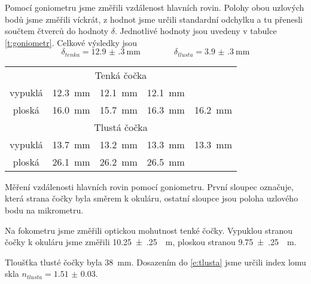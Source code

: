Pomocí goniometru jsme změřili vzdálenost hlavních rovin. 
Polohy obou uzlových bodů jsme změřili víckrát, z hodnot jsme určili standardní odchylku a tu přenesli součtem čtverců do hodnoty $\delta$. Jednotlivé hodnoty jsou uvedeny v tabulce \ref{t:goniometr}. 
Celkové výsledky jsou
\begin{equation*}
\delta_{tenka} = \SI{12.9(3)}{\mm} \qquad \qquad \delta_{tlusta} = \SI{3.9(3)}{\mm}
\end{equation*}


\begin{tabulka}[htbp]
\centering
\begin{tabular}{c|cccc}
\multicolumn{5}{c}{Tenká čočka} \\
vypuklá & \SI{12.3}{\mm} & \SI{12.1}{\mm} & \SI{12.1}{\mm} & \\
ploská & \SI{16.0}{\mm} & \SI{15.7}{\mm} & \SI{16.3}{\mm} & \SI{16.2}{\mm} \\

\hline \hline
\multicolumn{5}{c}{Tlustá čočka} \\
vypuklá & \SI{13.7}{\mm} & \SI{13.2}{\mm} & \SI{13.3}{\mm} & \SI{13.3}{\mm} \\
ploská & \SI{26.1}{\mm} & \SI{26.2}{\mm} & \SI{26.5}{\mm} & \\
\end{tabular}
\caption{Měření vzdálenosti hlavních rovin pomocí goniometru. První sloupec označuje, která strana čočky byla směrem k okuláru, ostatní sloupce jsou poloha uzlového bodu na mikrometru.}
\label{t:goniometr}
\end{tabulka}



Na fokometru jsme změřili optickou mohutnost tenké čočky. Vypuklou stranou čočky k okuláru jsme změřili \SI{10.25(25)}{\per\metre}, ploskou stranou \SI{9.75(25)}{\per\metre}.


Tloušťka tlusté čočky byla \SI{38}{\mm}. Dosazením do \eqref{e:tlusta} jsme určili index lomu skla $n_{tlusta}=\num{1.51(3)}$.